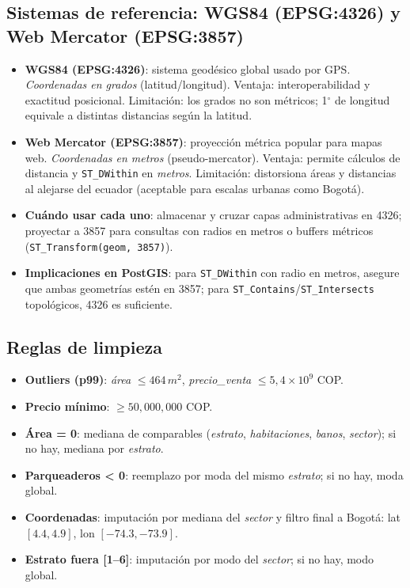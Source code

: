 \subsection{Sistemas de referencia: WGS84 (EPSG:4326) y Web Mercator (EPSG:3857)}\label{annex:crs}
\begin{itemize}
    \item \textbf{WGS84 (EPSG:4326)}: sistema geodésico global usado por GPS. \emph{Coordenadas en grados} (latitud/longitud). Ventaja: interoperabilidad y exactitud posicional. Limitación: los grados no son métricos; 1$^{\circ}$ de longitud equivale a distintas distancias según la latitud.
    \item \textbf{Web Mercator (EPSG:3857)}: proyección métrica popular para mapas web. \emph{Coordenadas en metros} (pseudo-mercator). Ventaja: permite cálculos de distancia y \texttt{ST\_DWithin} en \emph{metros}. Limitación: distorsiona áreas y distancias al alejarse del ecuador (aceptable para escalas urbanas como Bogotá).
    \item \textbf{Cuándo usar cada uno}: almacenar y cruzar capas administrativas en 4326; proyectar a 3857 para consultas con radios en metros o buffers métricos (\texttt{ST\_Transform(geom, 3857)}).
    \item \textbf{Implicaciones en PostGIS}: para \texttt{ST\_DWithin} con radio en metros, asegure que ambas geometrías estén en 3857; para \texttt{ST\_Contains}/\texttt{ST\_Intersects} topológicos, 4326 es suficiente.
\end{itemize}

\subsection{Reglas de limpieza}
\begin{itemize}
    \item \textbf{Outliers (p99)}: \emph{área} \(\leq 464\,m^2\), \emph{precio\_venta} \(\leq 5{,}4\times10^9\) COP.
    \item \textbf{Precio mínimo}: \(\geq 50{,}000{,}000\) COP.
    \item \textbf{Área = 0}: mediana de comparables (\emph{estrato}, \emph{habitaciones}, \emph{banos}, \emph{sector}); si no hay, mediana por \emph{estrato}.
    \item \textbf{Parqueaderos < 0}: reemplazo por moda del mismo \emph{estrato}; si no hay, moda global.
    \item \textbf{Coordenadas}: imputación por mediana del \emph{sector} y filtro final a Bogotá: lat \([4.4,4.9]\), lon \([-74.3,-73.9]\).
    \item \textbf{Estrato fuera [1--6]}: imputación por modo del \emph{sector}; si no hay, modo global.
\end{itemize}

